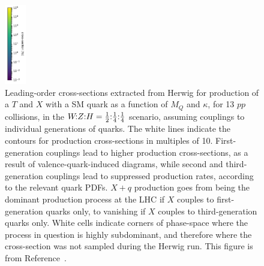 \begin{figure}[tbp]
    \includegraphics[height=3.5cm]{Figures/VLQ/xsScans/3rdGen/cbar.pdf} %
    \caption{Leading-order cross-sections extracted from Herwig for production of a $T$ and $X$
      with a SM quark as a function of $M_Q$ and $\kappa$, for \unit{13}{\TeV} $pp$
      collisions, in the $\text{$W\!$:$Z$:$H$} = \text{$\tfrac{1}{2}$:$\tfrac{1}{4}$:$\tfrac{1}{4}$}$ scenario, assuming couplings to individual
      generations of quarks.  The white lines indicate the contours for production
      cross-sections in multiples of 10. First-generation couplings lead to higher
      production cross-sections, as a result of valence-quark-induced diagrams,
      while second and third-generation couplings lead to suppressed production
      rates, according to the relevant quark PDFs. $X+q$ production goes from being
      the dominant production process at the LHC if $X$ couples to first-generation
      quarks only, to vanishing if $X$ couples to third-generation quarks only.
      White cells indicate corners of phase-space where the process in question is highly subdominant, and therefore where the cross-section was not sampled during the Herwig run. This figure is from Reference~\cite{VLQ_contur}.}
    \label{fig:Qqproduction}
\end{figure}

